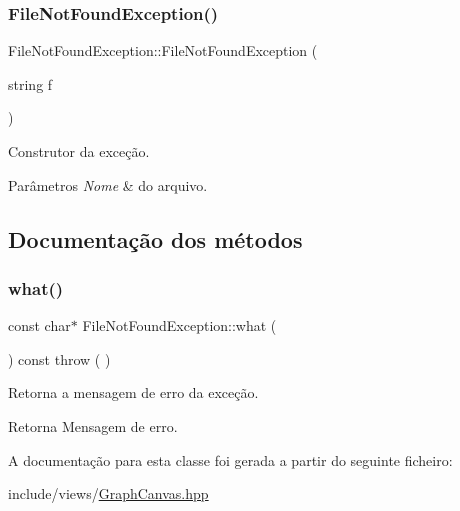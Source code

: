 \subsubsection{\texorpdfstring{FileNotFoundException()}{FileNotFoundException()}}
{\footnotesize\ttfamily File\+Not\+Found\+Exception\+::\+File\+Not\+Found\+Exception (\begin{DoxyParamCaption}\item[{string}]{f }\end{DoxyParamCaption})\hspace{0.3cm}{\ttfamily [inline]}}

Construtor da exceção. 
\begin{DoxyParams}{Parâmetros}
{\em Nome} & do arquivo. \\
\hline
\end{DoxyParams}


\subsection{Documentação dos métodos}
\mbox{\label{classFileNotFoundException_a7b845599455543d92dffe50950f5fa8d}} 
\subsubsection{\texorpdfstring{what()}{what()}}
{\footnotesize\ttfamily const char$\ast$ File\+Not\+Found\+Exception\+::what (\begin{DoxyParamCaption}{ }\end{DoxyParamCaption}) const throw ( ) \hspace{0.3cm}{\ttfamily [inline]}}

Retorna a mensagem de erro da exceção. \begin{DoxyReturn}{Retorna}
Mensagem de erro. 
\end{DoxyReturn}


A documentação para esta classe foi gerada a partir do seguinte ficheiro\+:\begin{DoxyCompactItemize}
\item 
include/views/\mbox{\hyperlink{GraphCanvas_8hpp}{Graph\+Canvas.\+hpp}}\end{DoxyCompactItemize}
